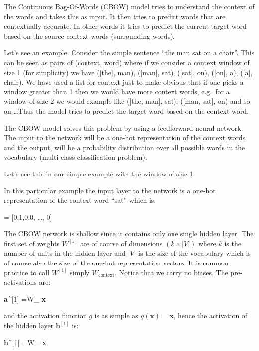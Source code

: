 The Continuous Bag-Of-Words (CBOW) model tries to understand the context of the words and takes this as input. It
then tries to predict words that are contextually accurate. In other words it tries to predict the current target
word based on the source context words (surrounding words).

\be
Let's see an example. Consider the simple sentence ``the man sat on a chair''. This can be seen as pairs of (context,
word) where if we consider a context window of size 1 (for simplicity) we have ([the], man), ([man], sat), ([sat],
on), ([on], a), ([a], chair). We have used a list for context just to make obvious that if one picks a window greater
than 1 then we would have more context words, e.g.\ for a window of size 2 we would example like ([the, man], sat),
([man, sat], on) and so on \ldots Thus the model tries to predict the target word based on the context word.
\ee

The CBOW model solves this problem by using a feedforward neural network. The input to the network will be a one-hot
representation of the context words and the output, will be a probability distribution over all possible words in the
vocabulary (multi-class classification problem).

\be
Let's see this in our simple example with the window of size 1.

\vspace{10pt}


In this particular example the input layer to the network is a one-hot representation of the context word ``sat''
which is:

\bse
{} = [0,1,0,0, \ldots, 0]
\ese
\ee

The CBOW network is shallow since it contains only one single hidden layer. The first set of weights $W^{[1]}$ are of
course of dimensions $(k \times |V|)$ where $k$ is the number of units in the hidden layer and $|V|$ is the size of
the vocabulary which is of course also the size of the one-hot representation vectors. It is common practice to call
$W^{[1]}$ simply $W_{\text{context}}$. Notice that we carry no biases. The pre-activations are:

\bse
\textbf{a}^{[1]} =W_{} \cdot \textbf{x}
\ese

and the activation function $g$ is as simple as $g(\textbf{x}) = \textbf{x}$, hence the activation of the hidden
layer $\textbf{h}^{[1]}$ is:

\bse
\textbf{h}^{[1]} =W_{} \cdot \textbf{x}
\ese

